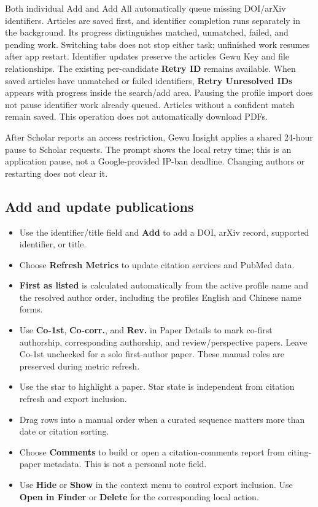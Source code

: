 \documentclass[10pt,letterpaper,oneside]{scrreprt}
\providecommand{\tightlist}{\setlength{\itemsep}{1pt}\setlength{\parskip}{0pt}}
\begin{document}
Both individual Add and Add All automatically queue missing DOI/arXiv identifiers. Articles are saved first, and identifier completion runs separately in the background. Its progress distinguishes matched, unmatched, failed, and pending work. Switching tabs does not stop either task; unfinished work resumes after app restart. Identifier updates preserve the article\textquotesingle s Gewu Key and file relationships. The existing per-candidate \textbf{Retry ID} remains available. When saved articles have unmatched or failed identifiers, \textbf{Retry Unresolved IDs} appears with progress inside the search/add area. Pausing the profile import does not pause identifier work already queued. Articles without a confident match remain saved. This operation does not automatically download PDFs.

After Scholar reports an access restriction, Gewu Insight applies a shared 24-hour pause to Scholar requests. The prompt shows the local retry time; this is an application pause, not a Google-provided IP-ban deadline. Changing authors or restarting does not clear it.

\subsection{Add and update publications}\label{add-and-update-publications}

\begin{itemize}
\tightlist
\item
  Use the identifier/title field and \textbf{Add} to add a DOI, arXiv record, supported identifier, or title.
\item
  Choose \textbf{Refresh Metrics} to update citation services and PubMed data.
\item
  \textbf{First as listed} is calculated automatically from the active profile name and the resolved author order, including the profile\textquotesingle s English and Chinese name forms.
\item
  Use \textbf{Co-1st}, \textbf{Co-corr.}, and \textbf{Rev.} in Paper Details to mark co-first authorship, corresponding authorship, and review/perspective papers. Leave Co-1st unchecked for a solo first-author paper. These manual roles are preserved during metric refresh.
\item
  Use the star to highlight a paper. Star state is independent from citation refresh and export inclusion.
\item
  Drag rows into a manual order when a curated sequence matters more than date or citation sorting.
\item
  Choose \textbf{Comments} to build or open a citation-comments report from citing-paper metadata. This is not a personal note field.
\item
  Use \textbf{Hide} or \textbf{Show} in the context menu to control export inclusion. Use \textbf{Open in Finder} or \textbf{Delete} for the corresponding local action.
\end{itemize}
\end{document}
